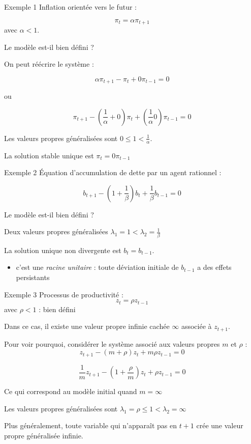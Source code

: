 \documentclass[
  ignorenonframetext,
]{beamer}
\providecommand{\tightlist}{%
  \setlength{\itemsep}{0pt}\setlength{\parskip}{0pt}}
\begin{document}
\begin{frame}{Exemple 1}
\label{exemple-1}
Inflation orientée vers le futur :

\[\pi_t = \alpha \pi_{t+1}\] avec \(\alpha<1\).

Le modèle est-il bien défini ?

\pause

On peut réécrire le système :

\[\alpha \pi_{t+1} - \pi_t + 0 \pi_{t-1}  = 0\]

ou

\[\pi_{t+1} - \left(\frac{1}{\alpha} + 0 \right)\pi_t + \left(\frac{1}{\alpha} 0\right) \pi_{t-1} = 0\]

\pause

Les valeurs propres généralisées sont \(0\leq 1 < \frac{1}{\alpha}\).

\pause

La solution stable unique est \(\pi_t=0 \pi_{t-1}\)
\end{frame}

\begin{frame}{Exemple 2}
\label{exemple-2}
Équation d'accumulation de dette par un agent rationnel :

\[b_{t+1} - (1+\frac{1}{\beta}) b_t + \frac{1}{\beta} b_{t-1} = 0\]

Le modèle est-il bien défini ?

\pause

Deux valeurs propres généralisées
\(\lambda_1=1 < \lambda_2=\frac{1}{\beta}\)

\pause

La solution unique non divergente est \(b_t = b_{t-1}\).

\begin{itemize}
\tightlist
\item
  c'est une \emph{racine unitaire} : toute déviation initiale de
  \(b_{t-1}\) a des effets persistants
\end{itemize}
\end{frame}

\begin{frame}{Exemple 3}
\label{exemple-3}
Processus de productivité : \[z_t = \rho z_{t-1}\] avec \(\rho<1\) :
{bien défini}

\pause

Dans ce cas, il existe une valeur propre infinie cachée \(\infty\)
associée à \(z_{t+1}\).

\pause

Pour voir pourquoi, considérer le système associé aux valeurs propres
\(m\) et \(\rho\) : \[z_{t+1} - (m+\rho) z_t + m \rho z_{t-1} = 0\]

\[\frac{1}{m} z_{t+1} - (1+\frac{\rho}{m}) z_t + \rho z_{t-1} = 0\]

Ce qui correspond au modèle initial quand \(m=\infty\)

\pause

Les valeurs propres généralisées sont
\(\lambda_1 = \rho \leq 1 < \lambda_2 = \infty\)

Plus généralement, toute variable qui n'apparaît pas en \(t+1\) crée une
valeur propre généralisée infinie.
\end{frame}
\end{document}
